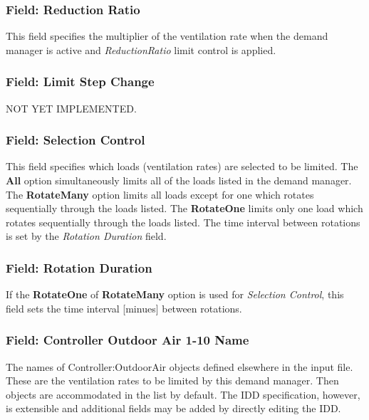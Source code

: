\subsubsection{Field: Reduction Ratio}\label{field-reduction-ratio}

This field specifies the multiplier of the ventilation rate when the demand manager is active and \emph{ReductionRatio} limit control is applied.

\subsubsection{Field: Limit Step Change}\label{field-limit-step-change-3}

NOT YET IMPLEMENTED.

\subsubsection{Field: Selection Control}\label{field-selection-control-4}

This field specifies which loads (ventilation rates) are selected to be limited. The \textbf{All} option simultaneously limits all of the loads listed in the demand manager. The \textbf{RotateMany} option limits all loads except for one which rotates sequentially through the loads listed. The \textbf{RotateOne} limits only one load which rotates sequentially through the loads listed. The time interval between rotations is set by the \emph{Rotation Duration} field.

\subsubsection{Field: Rotation Duration}\label{field-rotation-duration-4}

If the \textbf{RotateOne} of \textbf{RotateMany} option is used for \emph{Selection Control}, this field sets the time interval {[}minues{]} between rotations.

\subsubsection{Field: Controller Outdoor Air 1-10 Name}\label{field-controller-outdoor-air-1-10-name}

The names of Controller:OutdoorAir objects defined elsewhere in the input file. These are the ventilation rates to be limited by this demand manager. Then objects are accommodated in the list by default. The IDD specification, however, is extensible and additional fields may be added by directly editing the IDD.

